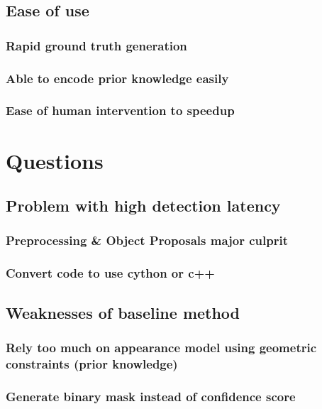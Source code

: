 \documentclass[11pt]{article}
\begin{document}
\subsection{Ease of use}
\label{sec:orgfefffd7}
\subsubsection{Rapid ground truth generation}
\label{sec:org2bc8d3c}
\subsubsection{Able to encode prior knowledge easily}
\label{sec:orgdf25fcd}
\subsubsection{Ease of human intervention to speedup}
\label{sec:orga2b0745}

\section{Questions}
\label{sec:orgc296475}
\subsection{Problem with high detection latency}
\label{sec:orge41188b}
\subsubsection{Preprocessing \& Object Proposals major culprit}
\label{sec:org63a356d}
\subsubsection{Convert code to use cython or c++}
\label{sec:orgf3064f2}
\subsection{Weaknesses of baseline method}
\label{sec:orgc70d52f}
\subsubsection{Rely too much on appearance model using geometric constraints (prior knowledge)}
\label{sec:org74e2485}
\subsubsection{Generate binary mask instead of confidence score}
\label{sec:org45d58ac}
\end{document}
